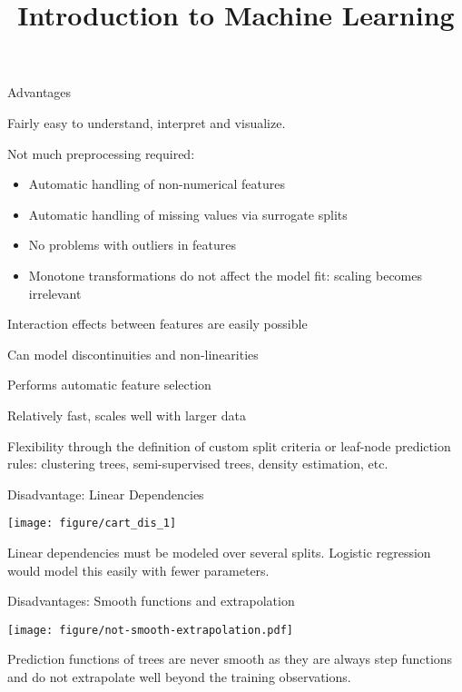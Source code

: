 \documentclass[11pt,compress,t,notes=noshow, xcolor=table]{beamer}
\title{Introduction to Machine Learning}
\begin{document}

\begin{framei}{Advantages}
    \item Fairly easy to understand, interpret and visualize.
    \item Not much preprocessing required:
    \begin{itemize}
      \item Automatic handling of non-numerical features
      \item Automatic handling of missing values via surrogate splits
      \item No problems with outliers in features
      \item Monotone transformations do not affect the model fit: scaling becomes irrelevant
    \end{itemize}
    \item Interaction effects between features are easily possible
    \item Can model discontinuities and non-linearities
    \item Performs automatic feature selection
    \item Relatively fast, scales well with larger data
    \item Flexibility through the definition of custom split criteria or leaf-node prediction rules: clustering trees, semi-supervised trees, density estimation, etc.
\end{framei}

\begin{frame2}{Disadvantage: Linear Dependencies}

{\centering \texttt{[image: figure/cart\_dis\_1]} 

}


Linear dependencies must be modeled over several splits. 
Logistic regression would model this easily with fewer parameters.
\end{frame2}

\begin{frame2}{Disadvantages: Smooth functions and extrapolation}


{\centering \texttt{[image: figure/not-smooth-extrapolation.pdf]} 

}

Prediction functions of trees are never smooth as they are always step functions and do not extrapolate well beyond the training observations. %

\end{frame2}
\end{document}
